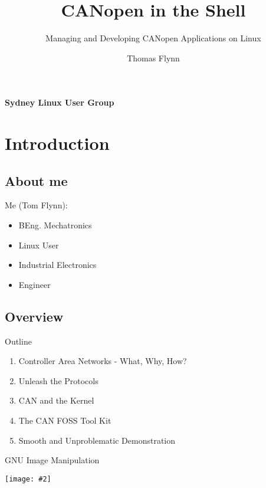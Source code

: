 \documentclass{beamer}
\title{CANopen in the Shell}
\subtitle{Managing and Developing CANopen Applications on Linux}
\author{Thomas Flynn}
\newcommand {\framedgraphic}[2] {
    \begin{frame}{#1}
        \begin{center}
            \texttt{[image: \#2]}
        \end{center}
    \end{frame}
}
\begin{document}
 

  \begin{frame}
    \framesubtitle{\textbf{S}ydney \textbf{L}inux \textbf{U}ser \textbf{Group}}
    
    \titlepage
  \end{frame}

  
\section*{Introduction}

\subsection*{About me}
\begin{frame}
    \huge{Me (Tom Flynn):}
    \begin{itemize}
      \item{BEng. Mechatronics}
      \item{Linux User}
      \item{Industrial Electronics}
      \item{Engineer}
    \end{itemize}
    \end{frame}
  
\subsection*{Overview}
  \begin{frame}{Outline}
    \begin{enumerate}
    \item{Controller Area Networks - What, Why, How?}
      \pause
    \item{Unleash the Protocols}
      \pause
    \item{CAN and the Kernel}
      \pause
    \item{The CAN FOSS Tool Kit}
      \pause
      \item{Smooth and Unproblematic Demonstration}
   \end{enumerate}        
\end{frame}
  
  \framedgraphic{GNU Image Manipulation}{./images/title_slide}
\end{document}
